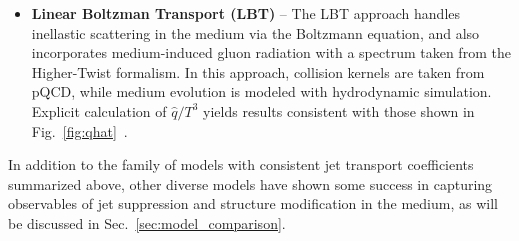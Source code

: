 \begin{itemize}
\item \textbf{Linear Boltzman Transport (LBT)} -- The LBT approach handles inellastic scattering in the medium via the Boltzmann equation, and also incorporates medium-induced gluon radiation with a spectrum taken from the Higher-Twist formalism.  In this approach, collision kernels are taken from pQCD, while medium evolution is modeled with hydrodynamic simulation.  Explicit calculation of $\hat{q}/T^{3}$ yields results consistent with those shown in Fig.~\ref{fig:qhat}~\cite{Cao:2016gvr, Cao:2017hhk}.   


\end{itemize}

\noindent In addition to the family of models with consistent jet transport coefficients summarized above, other diverse models have shown some success in capturing observables of jet suppression and structure modification in the medium, as will be discussed in Sec.~\ref{sec:model_comparison}.
 
